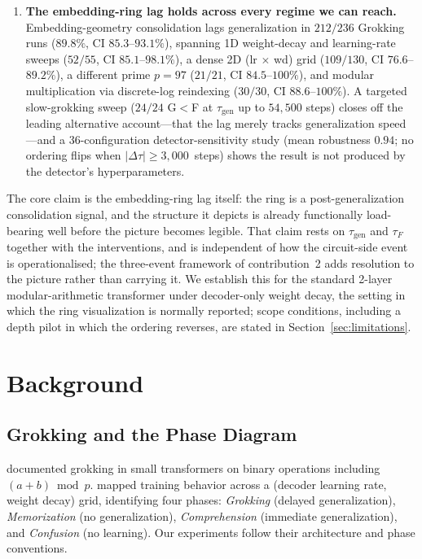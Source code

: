 \documentclass{article}
\newcommand{\taug}{\tau_{\mathrm{gen}}}
\newcommand{\tauf}{\tau_{F}}
\newcommand{\Dtau}{\Delta\tau}
\begin{document}
\begin{enumerate}
  \item \textbf{The embedding-ring lag holds across every regime
    we can reach.}
    Embedding-geometry consolidation lags generalization in
    $212/236$ Grokking runs ($89.8\%$, CI $85.3$--$93.1\%$),
    spanning 1D weight-decay and learning-rate sweeps ($52/55$,
    CI $85.1$--$98.1\%$), a dense 2D
    (lr$\,\times\,$wd) grid ($109/130$, CI $76.6$--$89.2\%$),
    a different prime $p{=}97$ ($21/21$, CI $84.5$--$100\%$),
    and modular multiplication via discrete-log
    reindexing ($30/30$, CI $88.6$--$100\%$).
    A targeted slow-grokking sweep
    ($24/24$ G$<$F at $\taug$ up to $54{,}500$ steps) closes off
    the leading alternative account---that the lag merely tracks
    generalization speed---and a 36-configuration
    detector-sensitivity study (mean robustness $0.94$; no
    ordering flips when $|\Dtau|\geq 3{,}000$~steps) shows the
    result is not produced by the detector's hyperparameters.
\end{enumerate}

The core claim is the embedding-ring lag itself: the ring is a
post-generalization consolidation signal, and the structure it
depicts is already functionally load-bearing well before the
picture becomes legible.
That claim rests on $\taug$ and $\tauf$ together with the
interventions, and is independent of how the circuit-side event
is operationalised; the three-event framework of
contribution~2 adds resolution to the picture rather than
carrying it.
We establish this for the standard 2-layer modular-arithmetic
transformer under decoder-only weight decay, the setting in which
the ring visualization is normally reported; scope conditions,
including a depth pilot in which the ordering reverses, are
stated in Section~\ref{sec:limitations}.

\section{Background}
\label{sec:background}

\subsection{Grokking and the Phase Diagram}

\citet{power2022grokking} documented grokking in small transformers on
binary operations including $(a+b)\bmod p$.
\citet{liu2022towards} mapped training behavior across a
(decoder learning rate, weight decay) grid, identifying four phases:
\textit{Grokking} (delayed generalization), \textit{Memorization} (no
generalization), \textit{Comprehension} (immediate generalization),
and \textit{Confusion} (no learning).
Our experiments follow their architecture and phase conventions.
\end{document}
